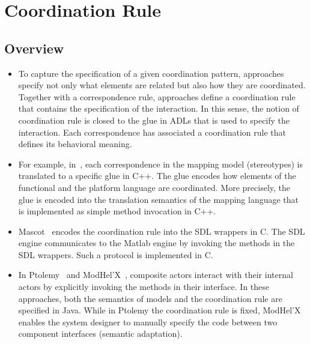 \section{Coordination Rule}
\subsection{Overview}
\begin{itemize}
			\item To capture the specification of a given coordination pattern, approaches specify not only what elements are related but also how they are coordinated. Together with a correspondence rule, approaches define a coordination rule that contains the specification of the interaction. In this sense, the notion of coordination rule is closed to the glue in ADLs that is used to specify the interaction. Each correspondence has associated a coordination rule that defines its behavioral meaning. 
		 
			\item For example, in~\cite{dinatale}, each correspondence in the mapping model (\ie stereotypes) is translated to a specific glue in C++. The glue encodes how elements of the functional and the platform language are coordinated. More precisely, the glue is encoded into the translation semantics of the mapping language that is implemented as simple method invocation in C++.
			
			\item Mascot~\cite{mascotbib} encodes the coordination rule into the SDL wrappers in C. The SDL engine communicates to the Matlab engine by invoking the methods in the SDL wrappers. Such a protocol is implemented in C. 
			
			\item In Ptolemy~\cite{ptoleframebib} and ModHel'X~\cite{modhelxbib}, composite actors interact with their internal actors by explicitly invoking the methods in their interface. In these approaches, both the semantics of models and the coordination rule are specified in Java. While in Ptolemy the coordination rule is fixed, ModHel'X enables the system designer to manually specify the code between two component interfaces (\ie semantic adaptation).

		\end{itemize}
		

